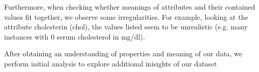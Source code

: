 Furthermore, when checking whether meanings of attributes and their contained values fit together, we observe some irregularities. For example, looking at the attribute cholesterin (chol), the values listed seem to be unrealistic (e.g. many instances with 0 serum cholesterol in mg/dl). 

After obtaining an understanding of properties and meaning of our data, we perform initial analysis to explore additional inisights of our dataset 

